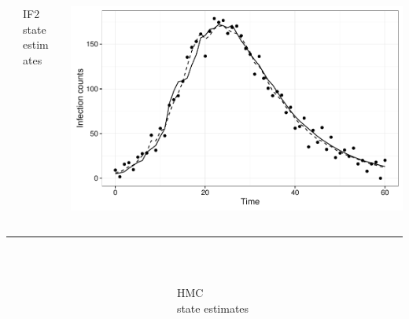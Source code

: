 \documentclass[12pt]{beamer}
\begin{document}
\begin{frame}

	\begin{columns}
		\begin{column}{0.00001\textwidth}
		\null
		\end{column}

		\begin{column}{0.25\textwidth}

			\null
			\large
			IF2 \\
			\vspace{0.5\baselineskip}
			\footnotesize
			state estimates
			
		\end{column}
		\begin{column}{0.65\textwidth}

			\includegraphics[width=\textwidth,height=0.45\textheight,keepaspectratio=true]{../../writing/SC1/images/if2state}

		\end{column}
	\end{columns}

	\textcolor{Grey50}{\rule{\textwidth}{0.4pt}} \\

	\begin{columns}
		\begin{column}{0.00001\textwidth}
		\null
		\end{column}

		\begin{column}{0.25\textwidth}

			\null
			\large
			HMC \\
			\vspace{0.5\baselineskip}
			\footnotesize
			state estimates
			

\end{column}
\end{columns}
\end{frame}
\end{document}
